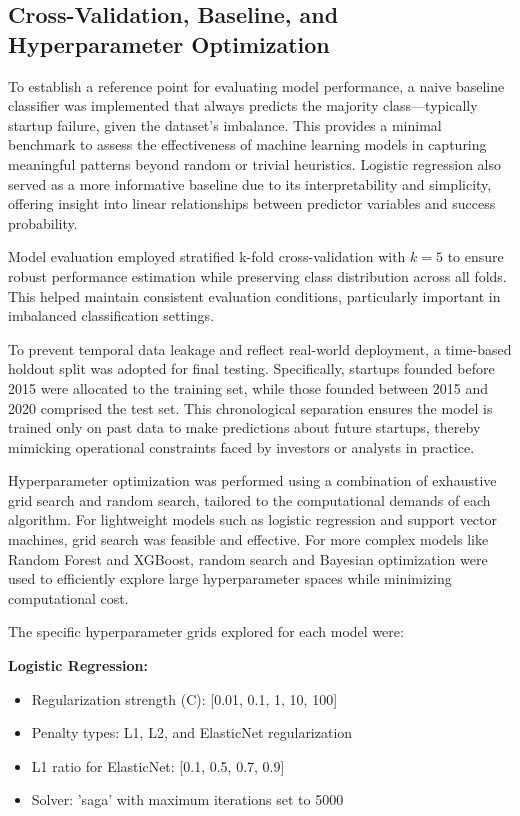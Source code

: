 \documentclass[conference]{IEEEtran}
\begin{document}
\subsection{Cross-Validation, Baseline, and Hyperparameter Optimization}

To establish a reference point for evaluating model performance, a naive baseline classifier was implemented that always predicts the majority class—typically startup failure, given the dataset's imbalance. This provides a minimal benchmark to assess the effectiveness of machine learning models in capturing meaningful patterns beyond random or trivial heuristics. Logistic regression also served as a more informative baseline due to its interpretability and simplicity, offering insight into linear relationships between predictor variables and success probability.

Model evaluation employed stratified k-fold cross-validation with $k=5$ to ensure robust performance estimation while preserving class distribution across all folds. This helped maintain consistent evaluation conditions, particularly important in imbalanced classification settings.

To prevent temporal data leakage and reflect real-world deployment, a time-based holdout split was adopted for final testing. Specifically, startups founded before 2015 were allocated to the training set, while those founded between 2015 and 2020 comprised the test set. This chronological separation ensures the model is trained only on past data to make predictions about future startups, thereby mimicking operational constraints faced by investors or analysts in practice.

Hyperparameter optimization was performed using a combination of exhaustive grid search and random search, tailored to the computational demands of each algorithm. For lightweight models such as logistic regression and support vector machines, grid search was feasible and effective. For more complex models like Random Forest and XGBoost, random search and Bayesian optimization were used to efficiently explore large hyperparameter spaces while minimizing computational cost.

The specific hyperparameter grids explored for each model were:

\textbf{Logistic Regression:}
\begin{itemize}
    \item Regularization strength (C): [0.01, 0.1, 1, 10, 100]
    \item Penalty types: L1, L2, and ElasticNet regularization
    \item L1 ratio for ElasticNet: [0.1, 0.5, 0.7, 0.9]
    \item Solver: 'saga' with maximum iterations set to 5000
\end{itemize}
\end{document}

